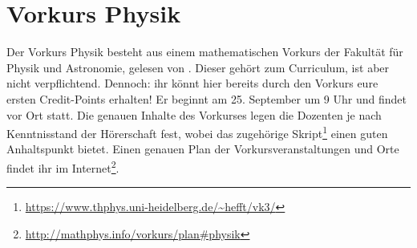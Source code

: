 \section{Vorkurs Physik}
Der Vorkurs Physik besteht aus einem mathematischen Vorkurs der Fakultät für Physik und Astronomie, gelesen von \dozentvorkurs. Dieser gehört zum Curriculum, ist aber nicht verpflichtend. Dennoch: ihr könnt hier bereits durch den Vorkurs eure ersten Credit-Points erhalten! Er beginnt am 25. September um 9 Uhr und findet vor Ort statt. Die genauen Inhalte des Vorkurses legen die Dozenten je nach Kenntnisstand der Hörerschaft fest, wobei das zugehörige Skript\footnote{\url{https://www.thphys.uni-heidelberg.de/~hefft/vk3/}} einen guten Anhaltspunkt bietet. Einen genauen Plan der Vorkursveranstaltungen und Orte findet ihr im Internet\footnote{\url{http://mathphys.info/vorkurs/plan\#physik}}.

